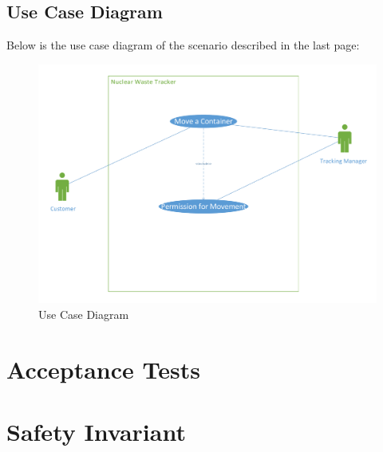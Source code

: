 \documentclass[fontsize=12pt,paper=letter,twoside]{scrartcl}
\begin{document}
\newpage
\subsection{Use Case Diagram}

Below is the use case diagram of the scenario described in the last page:
\\
\begin{figure}[!htb]
\begin{center}
\includegraphics[width=.9\textwidth]{images/move_container_uc.pdf}
\end{center}
\caption{Use Case Diagram}
\label{fig:move_container_uc}
\end{figure}

\newpage
\section{Acceptance Tests}

\newpage
\section{Safety Invariant}
\end{document}
